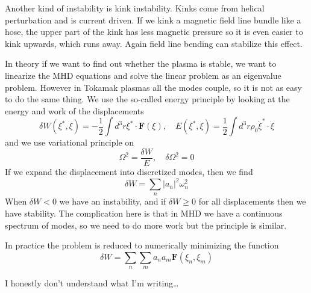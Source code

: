 \documentclass[letterpaper, 11pt]{article}
\numberwithin{equation}{section}
\numberwithin{figure}{section}
\begin{document}
Another kind of instability is kink instability. Kinks come from helical
perturbation and is current driven. If we kink a magnetic field line bundle like
a hose, the upper part of the kink has less magnetic pressure so it is even
easier to kink upwards, which runs away. Again field line bending can stabilize
this effect.

In theory if we want to find out whether the plasma is stable, we want to
linearize the MHD equations and solve the linear problem as an eigenvalue
problem. However in Tokamak plasmas all the modes couple, so it is not as easy
to do the same thing. We use the so-called energy principle by looking at the
energy and work of the displacements
\begin{equation}
  \label{eq:23}
  \delta W (\xi^{*}, \xi) = -\frac{1}{2}\int d^3r \xi^{*}\cdot \mathbf{F}(\xi),\quad E(\xi^{*},\xi) = \frac{1}{2}\int d^3r\rho_0\dot{\xi}^{*}\cdot\dot{\xi}
\end{equation}
and we use variational principle on
\begin{equation}
  \label{eq:24}
  \Omega^2 = \frac{\delta W}{E},\quad \delta\Omega^2 = 0
\end{equation}
If we expand the displacement into discretized modes, then we find
\begin{equation}
  \label{eq:25}
  \delta W = \sum_n \left| a_n \right|^2\omega_n^2
\end{equation}
When $\delta W < 0$ we have an instability, and if $\delta W\geq 0$ for all
displacements then we have stability. The complication here is that in MHD we
have a continuous spectrum of modes, so we need to do more work but the
principle is similar.

In practice the problem is reduced to numerically minimizing the function
\begin{equation}
  \label{eq:26}
  \delta W = \sum_n\sum_ma_na_m\mathbf{F}(\xi_n,\xi_m)
\end{equation}

I honestly don't understand what I'm writing\dots
\end{document}
